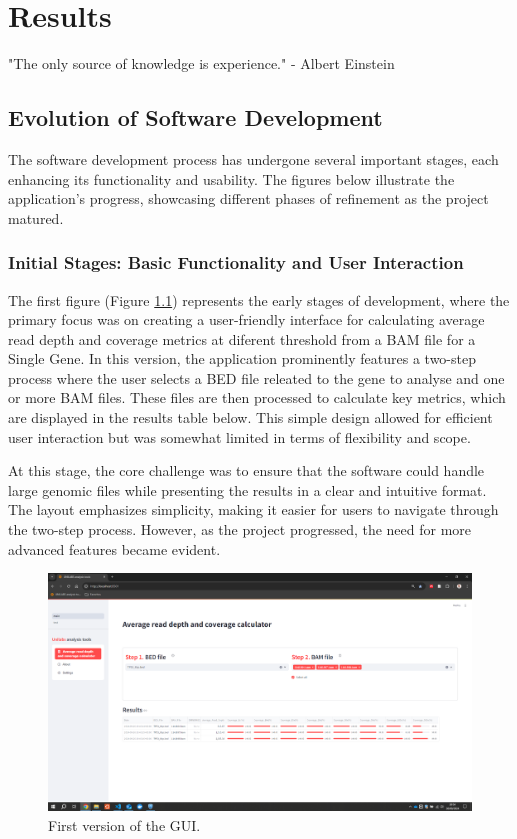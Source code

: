 \chapter{Results}
\label{chapter:Results}

\begin{introduction}
    "The only source of knowledge is experience." - Albert Einstein
\end{introduction}

\section{Evolution of Software Development}

The software development process has undergone several important stages, each enhancing its functionality and usability. The figures below illustrate the application's progress, showcasing different phases of refinement as the project matured.

\subsection{Initial Stages: Basic Functionality and User Interaction}

The first figure (Figure \ref{fig:v1}) represents the early stages of development, where the primary focus was on creating a user-friendly interface for calculating average read depth and coverage metrics at diferent threshold from a BAM file for a Single Gene. In this version, the application prominently features a two-step process where the user selects a BED file releated to the gene to analyse and one or more BAM files. These files are then processed to calculate key metrics, which are displayed in the results table below. This simple design allowed for efficient user interaction but was somewhat limited in terms of flexibility and scope.

At this stage, the core challenge was to ensure that the software could handle large genomic files while presenting the results in a clear and intuitive format. The layout emphasizes simplicity, making it easier for users to navigate through the two-step process. However, as the project progressed, the need for more advanced features became evident.

\begin{figure}[H]
    \centering
    \includegraphics[width=1\textwidth]{figs/v1.png}
    \caption{First version of the GUI.} 
    \label{fig:v1}
\end{figure}

